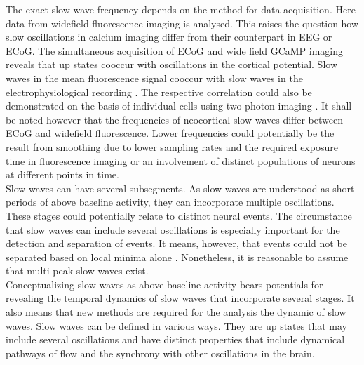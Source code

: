 The exact slow wave frequency depends on the method for data acquisition. Here data from widefield fluorescence imaging is analysed. This raises the question how slow oscillations in calcium imaging differ from their counterpart in EEG or ECoG. The simultaneous acquisition of ECoG and wide field GCaMP imaging reveals that up states cooccur with oscillations in the cortical potential. Slow waves in the mean fluorescence signal cooccur with slow waves in the electrophysiological recording \parencite{stroh2013making}. The respective correlation could also be demonstrated on the basis of individual cells using two photon imaging \parencite{niethard2018cortical}. It shall be noted however that the frequencies of neocortical slow waves differ between ECoG and widefield fluorescence. Lower frequencies could potentially be the result from smoothing due to lower sampling rates and the required exposure time in fluorescence imaging or an involvement of distinct populations of neurons at different points in time.\\
Slow waves can have several subsegments. As slow waves are understood as short periods of above baseline activity, they can incorporate multiple oscillations. These stages could potentially relate to distinct neural events. The circumstance that slow waves can include several oscillations is especially important for the detection and separation of events. It means, however, that events could not be separated based on local minima alone \parencite{celotto2020analysis}. Nonetheless, it is reasonable to assume that multi peak slow waves exist.\\
Conceptualizing slow waves as above baseline activity bears potentials for revealing the temporal dynamics of slow waves that incorporate several stages. It also means that new methods are required for the analysis the dynamic of slow waves. Slow waves can be defined in various ways. They are up states that may include several oscillations and have distinct properties that include dynamical pathways of flow and the synchrony with other oscillations in the brain.
